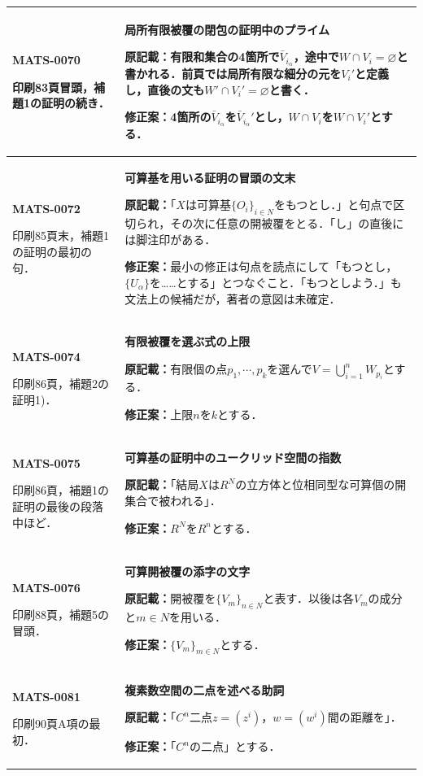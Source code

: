 \documentclass[a4paper,10pt]{ltjsarticle}
\begin{document}
\begin{longtable}{@{}>{\raggedright\arraybackslash}p{.19\linewidth}>{\raggedright\arraybackslash}p{.77\linewidth}@{}}
\hline
\hypertarget{MATS-0070}{}\textbf{MATS-0070}\par 印刷83頁冒頭，補題1の証明の続き． & \textbf{局所有限被覆の閉包の証明中のプライム}\par\textbf{原記載：}有限和集合の4箇所で$\bar V_{i_\alpha}$，途中で$W\cap V_i=\varnothing$と書かれる．前頁では局所有限な細分の元を$V_i'$と定義し，直後の文も$W'\cap V_i'=\varnothing$と書く．\par\textbf{修正案：}4箇所の$\bar V_{i_\alpha}$を$\bar V_{i_\alpha}'$とし，$W\cap V_i$を$W\cap V_i'$とする． \\[3pt]
\hline
\hypertarget{MATS-0072}{}\textbf{MATS-0072}\par 印刷85頁末，補題1の証明の最初の句． & \textbf{可算基を用いる証明の冒頭の文末}\par\textbf{原記載：}「$X$は可算基$\{O_i\}_{i\in N}$をもつとし．」と句点で区切られ，その次に任意の開被覆をとる．「し」の直後には脚注印がある．\par\textbf{修正案：}最小の修正は句点を読点にして「もつとし，$\{U_\alpha\}$を……とする」とつなぐこと．「もつとしよう．」も文法上の候補だが，著者の意図は未確定． \\[3pt]
\hline
\hypertarget{MATS-0074}{}\textbf{MATS-0074}\par 印刷86頁，補題2の証明1)． & \textbf{有限被覆を選ぶ式の上限}\par\textbf{原記載：}有限個の点$p_1,\cdots,p_k$を選んで$V=\bigcup_{i=1}^nW_{p_i}$とする．\par\textbf{修正案：}上限$n$を$k$とする． \\[3pt]
\hline
\hypertarget{MATS-0075}{}\textbf{MATS-0075}\par 印刷86頁，補題1の証明の最後の段落中ほど． & \textbf{可算基の証明中のユークリッド空間の指数}\par\textbf{原記載：}「結局$X$は$R^N$の立方体と位相同型な可算個の開集合で被われる」．\par\textbf{修正案：}$R^N$を$R^n$とする． \\[3pt]
\hline
\hypertarget{MATS-0076}{}\textbf{MATS-0076}\par 印刷88頁，補題5の冒頭． & \textbf{可算開被覆の添字の文字}\par\textbf{原記載：}開被覆を$\{V_m\}_{n\in N}$と表す．以後は各$V_m$の成分と$m\in N$を用いる．\par\textbf{修正案：}$\{V_m\}_{m\in N}$とする． \\[3pt]
\hline
\hypertarget{MATS-0081}{}\textbf{MATS-0081}\par 印刷90頁A項の最初． & \textbf{複素数空間の二点を述べる助詞}\par\textbf{原記載：}「$C^n$二点$z=(z^i)$，$w=(w^i)$間の距離を」．\par\textbf{修正案：}「$C^n$の二点」とする． \\[3pt]

\end{longtable}
\end{document}
